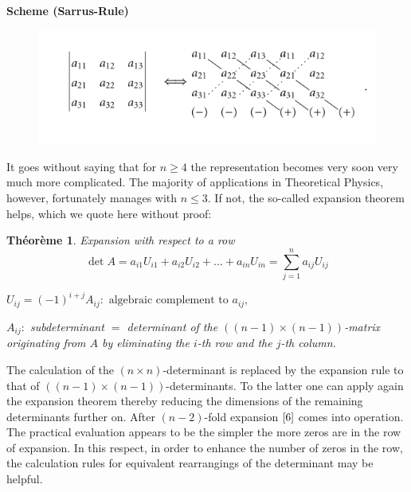 \documentclass[12pt]{book}
\theoremstyle{definition}\newtheorem{dfn}{Définition}[chapter]
\theoremstyle{plain}\newtheorem{thm}{Théorème}[chapter]
\theoremstyle{plain}\newtheorem{prp}{Proposition}[chapter]
\theoremstyle{plain}\newtheorem{lem}{\bf Lemme}[chapter]
\theoremstyle{plain}\newtheorem{axm}{\bf Axiome}[chapter]
\theoremstyle{plain}\newtheorem{lmm}{\bf Lemme}[chapter]
\theoremstyle{plain}\newtheorem{cor}{\bf Corollaire}[chapter]
\theoremstyle{remark}\newtheorem{rem}{Remarque}[chapter]
\begin{document}
{\bf Scheme (Sarrus-Rule)}
\begin{figure}[H]
	\centering
	\includegraphics[scale=1]{image//Mathematiques preparations//Determinant//2}
\end{figure}
It goes without saying that for $n \geq 4$ the representation becomes very soon very much more complicated. The majority of applications in Theoretical Physics, however, fortunately manages with $n \leq 3 .$ If not, the so-called expansion theorem helps, which we quote here without proof:
\begin{thm} Expansion with respect to a row
\begin{equation}
\operatorname{det} A=a_{i 1} U_{i 1}+a_{i 2} U_{i 2}+\ldots+a_{i n} U_{i n}=\sum_{j=1}^{n} a_{i j} U_{i j}\label{7}
\end{equation}


$U_{i j}=(-1)^{i+j} A_{i j}: \text { algebraic complement to } a_{i j},$


$A_{i j}:$ subdeterminant $=$ determinant of the $((n-1) \times(n-1))$-matrix originating from $A$ by eliminating the $i$-th row and the $j$-th column.
\end{thm}
The calculation of the $(n \times n)$-determinant is replaced by the expansion rule to that of $((n-1) \times(n-1))$-determinants. To the latter one can apply again the expansion theorem thereby reducing the dimensions of the remaining determinants further on. After $(n-2)$-fold expansion $\ref{6}$ comes into operation. The practical evaluation appears to be the simpler the more zeros are in the row of expansion. In this respect, in order to enhance the number of zeros in the row, the calculation rules for equivalent rearrangings of the determinant may be helpful.
\end{document}
